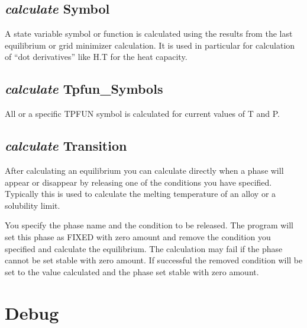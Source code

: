 \documentclass[12pt]{article}
\begin{document}
\subsection{{\em calculate} Symbol}

A state variable symbol or function is calculated using the results
from the last equilibrium or grid minimizer calculation.  It is used
in particular for calculation of ``dot derivatives'' like H.T for the
heat capacity.

\subsection{{\em calculate} Tpfun\_Symbols}

All or a specific TPFUN symbol is calculated for current values of T
and P.

\subsection{{\em calculate} Transition}

After calculating an equilibrium you can calculate directly when a
phase will appear or disappear by releasing one of the conditions you
have specified.  Typically this is used to calculate the melting
temperature of an alloy or a solubility limit.  

You specify the phase name and the condition to be released.  The
program will set this phase as FIXED with zero amount and remove the
condition you specified and calculate the equilibrium.  The
calculation may fail if the phase cannot be set stable with zero
amount.  If successful the removed condition will be set to the value
calculated and the phase set stable with zero amount.

\section{Debug }
\end{document}
